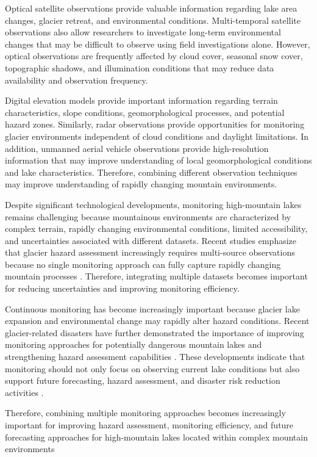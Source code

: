 \documentclass[12pt,a4paper]{report}
\begin{document}
Optical satellite observations provide valuable information regarding lake area changes, glacier retreat, and environmental conditions. Multi-temporal satellite observations also allow researchers to investigate long-term environmental changes that may be difficult to observe using field investigations alone. However, optical observations are frequently affected by cloud cover, seasonal snow cover, topographic shadows, and illumination conditions that may reduce data availability and observation frequency. 

Digital elevation models provide important information regarding terrain characteristics, slope conditions, geomorphological processes, and potential hazard zones. Similarly, radar observations provide opportunities for monitoring glacier environments independent of cloud conditions and daylight limitations. In addition, unmanned aerial vehicle observations provide high-resolution information that may improve understanding of local geomorphological conditions and lake characteristics. Therefore, combining different observation techniques may improve understanding of rapidly changing mountain environments. 

Despite significant technological developments, monitoring high-mountain lakes remains challenging because mountainous environments are characterized by complex terrain, rapidly changing environmental conditions, limited accessibility, and uncertainties associated with different datasets. Recent studies emphasize that glacier hazard assessment increasingly requires multi-source observations because no single monitoring approach can fully capture rapidly changing mountain processes \cite{Emmer2022, Gu2023}. Therefore, integrating multiple datasets becomes important for reducing uncertainties and improving monitoring efficiency. 

Continuous monitoring has become increasingly important because glacier lake expansion and environmental change may rapidly alter hazard conditions. Recent glacier-related disasters have further demonstrated the importance of improving monitoring approaches for potentially dangerous mountain lakes and strengthening hazard assessment capabilities \cite{Shugar2021}. These developments indicate that monitoring should not only focus on observing current lake conditions but also support future forecasting, hazard assessment, and disaster risk reduction activities \cite{Emmer2022}. 

Therefore, combining multiple monitoring approaches becomes increasingly important for improving hazard assessment, monitoring efficiency, and future forecasting approaches for high-mountain lakes located within complex mountain environments
\end{document}
